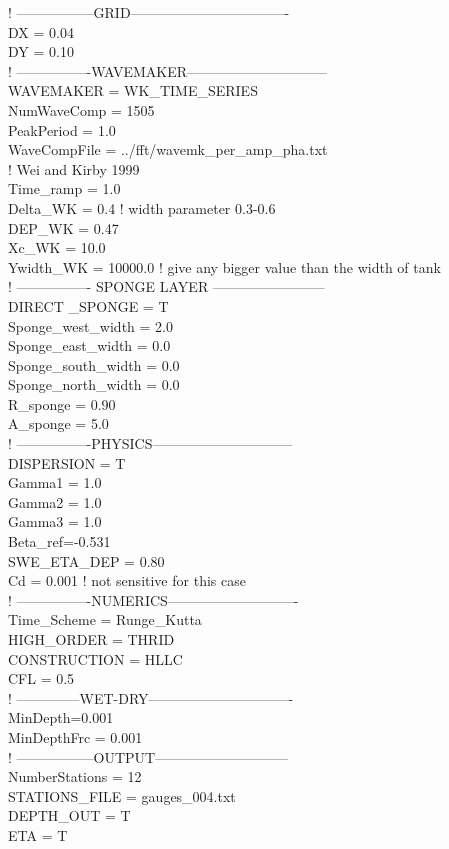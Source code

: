 \documentclass[11pt]{article}
\begin{document}
  ! -----------------GRID----------------------------------\\
DX = 0.04\\
DY = 0.10\\

  ! ----------------WAVEMAKER------------------------------\\
WAVEMAKER = WK\_TIME\_SERIES\\
NumWaveComp = 1505\\
PeakPeriod = 1.0\\
WaveCompFile = ../fft/wavemk\_per\_amp\_pha.txt\\
  ! Wei and Kirby 1999\\
Time\_ramp = 1.0 \\
Delta\_WK = 0.4    ! width parameter 0.3-0.6\\
DEP\_WK = 0.47\\
Xc\_WK = 10.0\\
Ywidth\_WK = 10000.0  ! give any bigger value than the width of tank\\

  ! ---------------- SPONGE LAYER ------------------------\\
DIRECT \_SPONGE = T\\
Sponge\_west\_width =  2.0\\
Sponge\_east\_width =  0.0\\
Sponge\_south\_width = 0.0\\
Sponge\_north\_width = 0.0\\
R\_sponge = 0.90\\
A\_sponge = 5.0\\

  ! ----------------PHYSICS------------------------------\\
DISPERSION = T\\
Gamma1 = 1.0\\
Gamma2 = 1.0\\
Gamma3 = 1.0\\
Beta\_ref=-0.531\\
SWE\_ETA\_DEP = 0.80\\
Cd = 0.001   ! not sensitive for this case\\
  
  ! ----------------NUMERICS----------------------------\\
Time\_Scheme = Runge\_Kutta\\
HIGH\_ORDER = THRID\\
CONSTRUCTION = HLLC\\
CFL = 0.5\\
  ! --------------WET-DRY-------------------------------\\
MinDepth=0.001\\
MinDepthFrc = 0.001\\
  ! -----------------OUTPUT-----------------------------\\
NumberStations = 12\\
STATIONS\_FILE = gauges\_004.txt\\
DEPTH\_OUT = T\\
ETA = T\\
\end{document}
